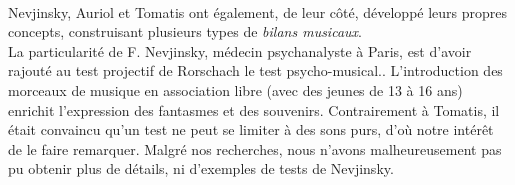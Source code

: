 \\
Nevjinsky, Auriol et Tomatis ont également, de leur côté, développé
leurs propres concepts, construisant plusieurs types 
de \emph{bilans musicaux}.
\\
La particularité de F. Nevjinsky, médecin psychanalyste à
  Paris, est d'avoir rajouté au test projectif de Rorschach le test psycho-musical.\autocite{nevjinsky:adolescence}.
L'introduction des morceaux de musique en association libre (avec
 des jeunes de 13 à 16 ans) enrichit l'expression des fantasmes et des
 souvenirs. %
Contrairement à Tomatis,
 il était convaincu qu'un test ne peut 
se limiter à des sons purs, d'où notre intérêt de le faire remarquer. Malgré nos recherches, nous n'avons 
malheureusement pas pu obtenir plus de détails, ni d'exemples de tests de Nevjinsky.
